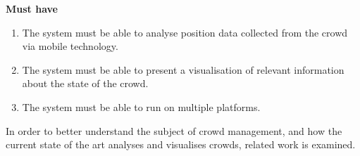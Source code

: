 \textbf{Must have}
\begin{enumerate}
    \item The system must be able to analyse position data collected from the crowd via mobile technology.
    \item The system must be able to present a visualisation of relevant information about the state of the crowd.
    \item The system must be able to run on multiple platforms.
\end{enumerate}

In order to better understand the subject of crowd management, and how the current state of the art analyses and visualises crowds, related work is examined.

